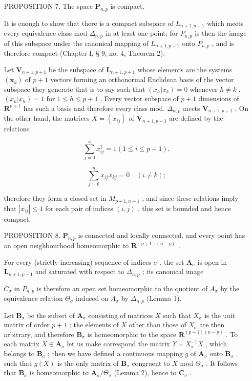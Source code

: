 PROPOSITION 7. The space \(\mathbf{P}_{n,p}\) is compact.

It is enough to show that there is a compact subspace of \(L_{n+1, p+1}\) which meets every equivalence class mod \(\Delta_{n,p}\) in at least one point; for \(P_{n,p}\) is then the image of this subspace under the canonical mapping of \(L_{n+1, p+1}\) onto \(P_{n,p}\) , and is therefore compact (Chapter I, § 9, no. 4, Theorem 2).

Let \(\mathbf{V}_{n+1, p+1}\) be the subspace of \(\mathbf{L}_{n+1, p+1}\) whose elements are the systems \((\boldsymbol{x}_k)\) of \(p + 1\) vectors forming an orthonormal Euclidean basis of the vector subspace they generate that is to say such that \((x_h | x_k) = 0\) whenever \(h \neq k\) , \((x_h | x_h) = 1\) for \(1 \leqslant h \leqslant p + 1\) . Every vector subspace of \(p + 1\) dimensions of \(\mathbf{R}^{n+1}\) has such a basis and therefore every class mod. \(\Delta_{n,p}\) meets \(\mathbf{V}_{n+1, p+1}\) . On the other hand, the matrices \(X = (x_{ij})\) of \(\mathbf{V}_{n+1, p+1}\) are defined by the relations

\[
\sum_ {j = 0} ^ {n} x _ {i j} ^ {2} = 1 (1 \leqslant i \leqslant p + 1),
\]

\[
\sum_ {j = 0} ^ {n} x _ {i j} x _ {k j} = 0 \quad (i \neq k);
\]

therefore they form a closed set in \(M_{p+1, n+1}\) ; and since these relations imply that \(|x_{ij}| \leqslant 1\) for each pair of indices \((i, j)\) , this set is bounded and hence compact.

PROPOSITION 8. \(\mathbf{P}_{n,p}\) is connected and locally connected, and every point has an open neighbourhood homeomorphic to \(\mathbf{R}^{(p+1)(n-p)}\) .

For every (strictly increasing) sequence of indices \(\sigma\) , the set \(\mathbf{A}_{\sigma}\) is open in \(\mathbf{L}_{n+1, p+1}\) and saturated with respect to \(\Delta_{n,p}\) ; its canonical image

\(C_{\sigma}\) in \(P_{n,p}\) is therefore an open set homeomorphic to the quotient of \(A_{\sigma}\) by the equivalence relation \(\Theta_{\sigma}\) induced on \(A_{\sigma}\) by \(\Delta_{n,p}\) (Lemma 1).

Let \(\mathbf{B}_{\sigma}\) be the subset of \(\mathbf{A}_{\sigma}\) consisting of matrices \(X\) such that \(X_{\sigma}\) is the unit matrix of order \(p + 1\) ; the elements of \(X\) other than those of \(X_{\sigma}\) are then arbitrary, and therefore \(\mathbf{B}_{\sigma}\) is homeomorphic to the space \(\mathbf{R}^{(p + 1)(n - p)}\) . To each matrix \(X \in \mathbf{A}_{\sigma}\) let us make correspond the matrix \(\Upsilon = X_{\sigma}^{-1}X\) , which belongs to \(\mathbf{B}_{\sigma}\) ; then we have defined a continuous mapping \(g\) of \(\mathbf{A}_{\sigma}\) onto \(\mathbf{B}_{\sigma}\) , such that \(g(X)\) is the only matrix of \(\mathbf{B}_{\sigma}\) congruent to \(X\) mod \(\Theta_{\sigma}\) . It follows that \(\mathbf{B}_{\sigma}\) is homeomorphic to \(\mathbf{A}_{\sigma}/\Theta_{\sigma}\) (Lemma 2), hence to \(\mathbf{C}_{\sigma}\) .

